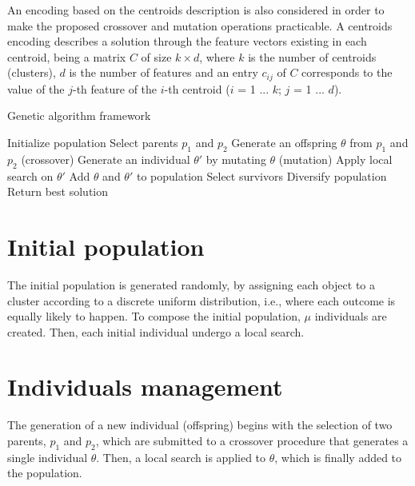 An encoding based on the centroids description is also considered in order to make the proposed crossover and mutation operations practicable. A centroids encoding describes a solution through the feature vectors existing in each centroid, being a matrix $C$ of size $k \times d$, where $k$ is the number of centroids (clusters), $d$ is the number of features and an entry $c_{ij}$ of $C$ corresponds to the value of the $j$-th feature of the $i$-th centroid ($i$ = 1 ... $k$; $j$ = 1 ... $d$).


\begin{algorithm}[H]
\caption{Genetic algorithm framework}
\label{genetic-algo}
\begin{algorithmic}[1]
\STATE Initialize population
\STATE Select parents $p_1$ and $p_2$
\STATE Generate an offspring $\theta$ from $p_1$ and $p_2$ (crossover)
\STATE Generate an individual $\theta'$ by mutating $\theta$ (mutation)
\STATE Apply local search on $\theta'$
\STATE Add $\theta$ and $\theta'$ to population
\STATE Select survivors
\STATE Diversify population
\ENDIF
\ENDIF
\ENDWHILE
\STATE Return best solution
\end{algorithmic}
\end{algorithm}

\section{Initial population}
The initial population is generated randomly, by assigning each object to a cluster according to a discrete uniform distribution, i.e., where each outcome is equally likely to happen. To compose the initial population, $\mu$ individuals are created. Then, each initial individual undergo a local search.

\section{Individuals management}
The generation of a new individual (offspring) begins with the selection of two parents, $p_1$ and $p_2$, which are submitted to a crossover procedure that generates a single individual $\theta$. Then, a local search is applied to $\theta$, which is finally added to the population.

